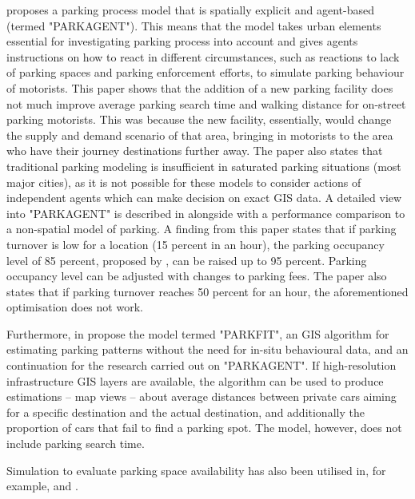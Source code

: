  proposes a parking process model that is spatially explicit and agent-based (termed "PARKAGENT"). This means that the model takes urban elements essential for investigating parking process into account and gives agents instructions on how to react in different circumstances, such as reactions to lack of parking spaces and parking enforcement efforts, to simulate parking behaviour of motorists. This paper shows that the addition of a new parking facility does not much improve average parking search time and walking distance for on-street parking motorists. This was because the new facility, essentially, would change the supply and demand scenario of that area, bringing in motorists to the area who have their journey destinations further away. The paper also states that traditional parking modeling is insufficient in saturated parking situations (most major cities), as it is not possible for these models to consider actions of independent agents which can make decision on exact GIS data. A detailed view into "PARKAGENT" is described in  alongside with a performance comparison to a non-spatial model of parking. A finding from this paper states that if parking turnover is low for a location (15 percent in an hour), the parking occupancy level of 85 percent, proposed by , can be raised up to 95 percent. Parking occupancy level can be adjusted with changes to parking fees. The paper also states that if parking turnover reaches 50 percent for an hour, the aforementioned optimisation does not work.

Furthermore, in  propose the model termed "PARKFIT", an GIS algorithm for estimating parking patterns without the need for in-situ behavioural data, and an continuation for the research carried out on "PARKAGENT". If high-resolution infrastructure GIS layers are available, the algorithm can be used to produce estimations -- map views -- about average distances between private cars aiming for a specific destination and the actual destination, and additionally the proportion of cars that fail to find a parking spot. The model, however, does not include parking search time. 

Simulation to evaluate parking space availability has also been utilised in, for example,  and .

